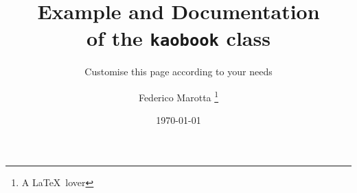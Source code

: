 \documentclass[
  fontsize=10pt,
  chapterentrydots=true,
  numbers=noenddot,
]{../kaobook}
\begin{document}
%
%
%
%

\titlehead{The \texttt{kaobook} class}
\subject{Use this document as a template}
\title[Example and Documentation of the {\normalfont\texttt{kaobook}} 
class]{Example and Documentation \\ of the {\normalfont\texttt{kaobook}} 
class}
\subtitle{Customise this page according to your needs}
\author[Federico Marotta]{Federico Marotta \thanks{A \LaTeX\ lover}}
\date{\today}
\publishers{an Awesome Publisher}

\frontmatter

%











%





\mainmatter



\widepage
{}
\marginpage
\end{document}
